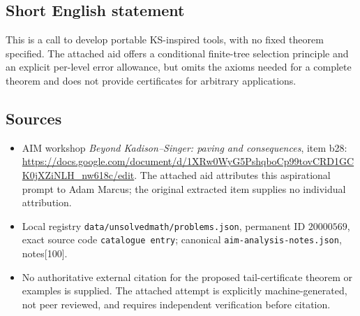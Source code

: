 \documentclass[11pt]{article}
\begin{document}
\subsection{Short English statement}
This is a call to develop portable KS-inspired tools, with no fixed theorem specified. The attached aid offers a conditional finite-tree selection principle and an explicit per-level error allowance, but omits the axioms needed for a complete theorem and does not provide certificates for arbitrary applications.
\subsection{Sources}
\begin{itemize}
\item AIM workshop \emph{Beyond Kadison--Singer: paving and consequences}, item b28: \url{https://docs.google.com/document/d/1XRw0WyG5PshqboCp99tovCRD1GCK0jXZiNLH_nw618c/edit}. The attached aid attributes this aspirational prompt to Adam Marcus; the original extracted item supplies no individual attribution.
\item Local registry \texttt{data/unsolvedmath/problems.json}, permanent ID \(20000569\), exact source code \texttt{catalogue entry}; canonical \texttt{aim-analysis-notes.json}, notes[100].
\item No authoritative external citation for the proposed tail-certificate theorem or examples is supplied. The attached attempt is explicitly machine-generated, not peer reviewed, and requires independent verification before citation.
\end{itemize}
\end{document}

